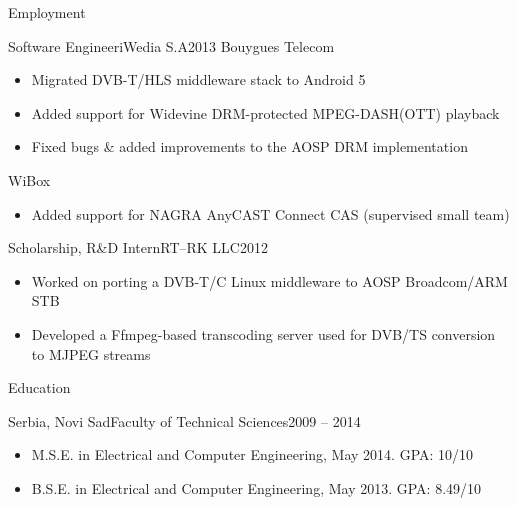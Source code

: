 \documentclass[]{mcdowellcv}
\begin{document}
\begin{cvsection}{Employment}
		\begin{cvsubsection}{Software Engineer}{iWedia S.A}{2013}
			Bouygues Telecom
			\begin{itemize}
				\item Migrated DVB-T/HLS middleware stack to Android 5
				\item Added support for Widevine DRM-protected MPEG-DASH(OTT) playback
				\item Fixed bugs \& added improvements to the AOSP DRM implementation \newline
			\end{itemize}
			WiBox
			\begin{itemize}
				\item Added support for NAGRA AnyCAST Connect CAS (supervised small team)
			\end{itemize}
		\end{cvsubsection}

		\begin{cvsubsection}{Scholarship, R\&D Intern}{RT--RK LLC}{2012}
			\begin{itemize}
				\item Worked on porting a DVB-T/C Linux middleware to AOSP Broadcom/ARM STB
				\item Developed a Ffmpeg-based transcoding server used for DVB/TS conversion to MJPEG streams
			\end{itemize}
		\end{cvsubsection}

	\end{cvsection}

	\begin{cvsection}{Education}
		\begin{cvsubsection}{Serbia, Novi Sad}{Faculty of Technical Sciences}{2009 -- 2014}
			\begin{itemize}
				\item M.S.E. in Electrical and Computer Engineering, May 2014. GPA: 10/10
				\item B.S.E. in Electrical and Computer Engineering, May 2013. GPA: 8.49/10
			\end{itemize}
		\end{cvsubsection}
	\end{cvsection}
\end{document}
